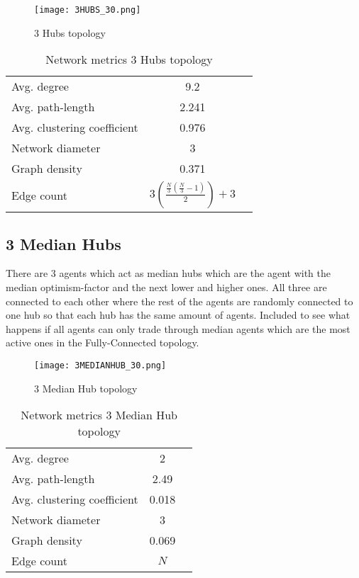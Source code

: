 \documentclass[Bachelorarbeit.tex]{subfiles}
\begin{document}
\begin{figure}[H]
	\centering
  \texttt{[image: 3HUBS\_30.png]}
	\caption{3 Hubs topology}
	\label{fig:topology_3HUBS_30}
\end{figure}

\begin{table}[h]
	\centering
	\caption{Network metrics 3 Hubs topology}
	\begin{tabular} { l c r }
		\hline
		Avg. degree & 9.2 \\
		Avg. path-length & 2.241 \\
		Avg. clustering coefficient & 0.976 \\
		Network diameter & 3 \\
		Graph density & 0.371\\
		Edge count & $3(\frac{\frac{N}{3}(\frac{N}{3} - 1)}{2}) + 3$ \\
		\hline
	\end{tabular}
\end{table}

\subsection{3 Median Hubs}
There are 3 agents which act as median hubs which are the agent with the median optimism-factor and the next lower and higher ones. All three are connected to each other where the rest of the agents are randomly connected to one hub so that each hub has the same amount of agents.
\medskip
Included to see what happens if all agents can only trade through median agents which are the most active ones in the Fully-Connected topology.

\begin{figure}[H]
	\centering
  \texttt{[image: 3MEDIANHUB\_30.png]}
	\caption{3 Median Hub topology}
	\label{fig:topology_3MEDIANHUB_30}
\end{figure}

\begin{table}[h]
	\centering
	\caption{Network metrics 3 Median Hub topology}
	\begin{tabular} { l c r }
		\hline
		Avg. degree & 2 \\
		Avg. path-length & 2.49 \\
		Avg. clustering coefficient & 0.018 \\
		Network diameter & 3 \\
		Graph density & 0.069 \\
		Edge count & $N$ \\
		\hline
	\end{tabular}
\end{table}
\end{document}
